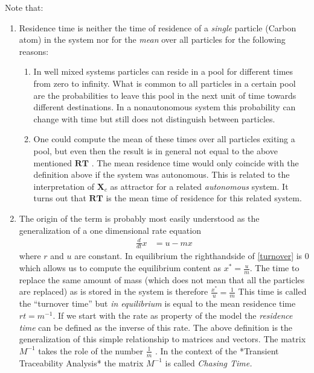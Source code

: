 \documentclass[journal abbreviation, manuscript]{copernicus}
\theoremstyle{definition}
\newcommand{\X}{\mathbf{X}}
\newcommand{\RT}{\mathbf{RT}}
\begin{document}
Note that: 
\begin{enumerate}
\item
Residence time is neither the time of residence of a \emph{single} particle (Carbon atom) in the system nor for the \emph{mean} over all particles for the following reasons:
\begin{enumerate}
  \item 
  In well mixed systems particles can reside in a pool for different times from zero to infinity. What is common to all particles in a certain pool are the probabilities to leave this pool in the next unit of time towards different destinations. In a nonautonomous system this probability can change with time but still does not distinguish between particles.
  \item 
  One could compute the mean of these times over all particles exiting a pool, but even then the result is in general not equal to the above mentioned $\RT$ \citet{Rasmussen2016JMB,Metzler2018PNAS}.
  The mean residence time would only coincide with the definition above if the system was autonomous.
  This is related to the interpretation of $\X_c$ as attractor for a related \emph{autonomous} system. It turns out that $\RT$ is the mean time of residence for this related system. 
\end{enumerate}
\item
The origin of the term is probably most easily understood as the generalization of a one dimensional rate equation 
\begin{align}
\label{turnover}
\frac{d}{dt} x &= u - m x  
\end{align}
where $r$ and $u$ are constant.
In equilibrium the righthandside of \eqref{turnover} is $0$ which allows us to compute the equilibrium content as $x^*=\frac{u}{m}$. 
The time to replace the same amount of mass (which does not mean that all the particles are replaced)  as is stored in the system is therefore 
$\frac{x^*}{u}=\frac{1}{m}$ 
This time is called the ``turnover time'' but \emph{in equilibrium} is equal to the mean residence time $rt= m^{-1}$. 
If we start with the rate as property of the model the {\it residence time} 
can be defined as the inverse of this rate. The above definition is the generalization of this simple relationship to 
matrices and vectors.
The matrix $M^{-1}$ takes the role of the number $\frac{1}{m}$ . 
In the context of the *Transient Traceability Analysis* the matrix $M^{-1}$ is called \it{Chasing Time}. 

\end{enumerate}
\end{document}
